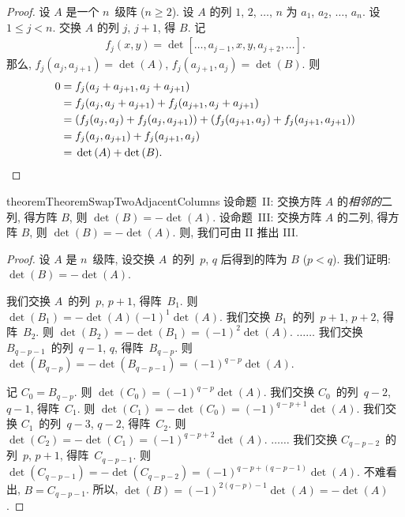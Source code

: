 \begin{proof}
    设 \(A\) 是一个 \(n\)~级阵 (\(n \geq 2\)).
    设 \(A\) 的列 \(1\), \(2\), \(\dots\), \(n\)
    为 \(a_1\), \(a_2\), \(\dots\), \(a_n\).
    设 \(1 \leq j < n\).
    交换 \(A\) 的列 \(j\), \(j+1\), 得 \(B\).
    记
    \begin{align*}
        f_j (x, y)
        = \det {[\dots, a_{j-1}, x, y, a_{j+2}, \dots]}.
    \end{align*}
    那么,
    \(f_j (a_j, a_{j+1}) = \det {(A)}\),
    \(f_j (a_{j+1}, a_j) = \det {(B)}\).
    则
    \begin{align*}
        0
        = {} & f_j (a_j + a_{j+1}, a_j + a_{j+1})    \\
        = {} & f_j (a_j, a_j + a_{j+1})
        + f_j (a_{j+1}, a_j + a_{j+1})               \\
        = {} & (f_j (a_j, a_j) + f_j (a_j, a_{j+1}))
        + (f_j (a_{j+1}, a_j)
        + f_j (a_{j+1}, a_{j+1}))                    \\
        = {} & f_j (a_j, a_{j+1})
        + f_j (a_{j+1}, a_j)                         \\
        = {} & \det {(A)} + \det {(B)}.
        \qedhere
    \end{align*}
\end{proof}

\begin{restatable}[]{theorem}{TheoremSwapTwoAdjacentColumns}
    设命题~II:
    交换方阵 \(A\) 的\emph{相邻的}二列, 得方阵 \(B\),
    则 \(\det {(B)} = -\det {(A)}\).
    设命题~III:
    交换方阵 \(A\) 的二列, 得方阵 \(B\),
    则 \(\det {(B)} = -\det {(A)}\).
    则, 我们可由 II 推出 III.
\end{restatable}

\begin{proof}
    设 \(A\) 是 \(n\)~级阵,
    设交换 \(A\)~的列~\(p\), \(q\) 后得到的阵为 \(B\)
    (\(p < q\)).
    我们证明:
    \(\det {(B)} = -\det {(A)}\).

    我们交换 \(A\)~的列~\(p\), \(p+1\), 得阵~\(B_1\).
    则 \(\det {(B_1)} = -\det {(A)}
    (-1)^{1} \det {(A)}\).
    我们交换 \(B_1\)~的列~\(p+1\), \(p+2\), 得阵~\(B_2\).
    则 \(\det {(B_2)} = -\det {(B_1)}
    = (-1)^{2} \det {(A)}\).
    \(\dots \dots\)
    我们交换 \(B_{q-p-1}\)~的列~\(q-1\), \(q\), 得阵~\(B_{q-p}\).
    则 \(\det {(B_{q-p})} = -\det {(B_{q-p-1})}
    = (-1)^{q-p} \det {(A)}\).

    记 \(C_0 = B_{q-p}\).
    则 \(\det {(C_0)} = (-1)^{q-p} \det {(A)}\).
    我们交换 \(C_0\)~的列~\(q-2\), \(q-1\), 得阵~\(C_1\).
    则 \(\det {(C_1)} = -\det {(C_0)}
    = (-1)^{q-p+1} \det {(A)}\).
    我们交换 \(C_1\)~的列~\(q-3\), \(q-2\), 得阵~\(C_2\).
    则 \(\det {(C_2)} = -\det {(C_1)}
    = (-1)^{q-p+2} \det {(A)}\).
    \(\dots \dots\)
    我们交换 \(C_{q-p-2}\)~的列~\(p\), \(p+1\),
    得阵~\(C_{q-p-1}\).
    则 \(\det {(C_{q-p-1})} = -\det {(C_{q-p-2})}
    = (-1)^{q-p+(q-p-1)} \det {(A)}\).
    不难看出, \(B = C_{q-p-1}\).
    所以,
    \(\det {(B)}
    = (-1)^{2(q-p)-1} \det {(A)}
    = -\det {(A)}\).
\end{proof}

